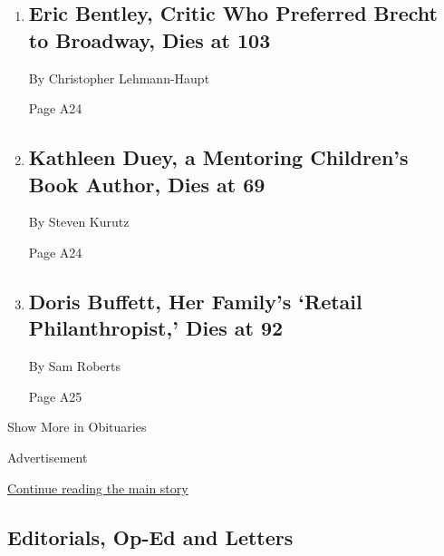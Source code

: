\begin{enumerate}
\def\labelenumi{\arabic{enumi}.}
\item
  \href{/2020/08/05/theater/eric-bentley-dead.html}{}

  \hypertarget{eric-bentley-critic-who-preferred-brecht-to-broadway-dies-at-103}{%
  \subsection{Eric Bentley, Critic Who Preferred Brecht to Broadway,
  Dies at
  103}\label{eric-bentley-critic-who-preferred-brecht-to-broadway-dies-at-103}}

  By Christopher Lehmann-Haupt

  Page A24
\item
  \href{/2020/08/05/books/kathleen-duey-dead.html}{}

  \hypertarget{kathleen-duey-a-mentoring-childrens-book-author-dies-at-69}{%
  \subsection{Kathleen Duey, a Mentoring Children's Book Author, Dies at
  69}\label{kathleen-duey-a-mentoring-childrens-book-author-dies-at-69}}

  By Steven Kurutz

  Page A24
\item
  \href{/2020/08/05/business/doris-buffett-her-familys-retail-philanthropist-dies-at-92.html}{}

  \hypertarget{doris-buffett-her-familys-retail-philanthropist-dies-at-92}{%
  \subsection{Doris Buffett, Her Family's `Retail Philanthropist,' Dies
  at
  92}\label{doris-buffett-her-familys-retail-philanthropist-dies-at-92}}

  By Sam Roberts

  Page A25
\end{enumerate}

Show More in Obituaries

Advertisement

\protect\hyperlink{after-mid3}{Continue reading the main story}

\hypertarget{editorials-op-ed-and-letters}{%
\subsection{Editorials, Op-Ed and
Letters}\label{editorials-op-ed-and-letters}}

